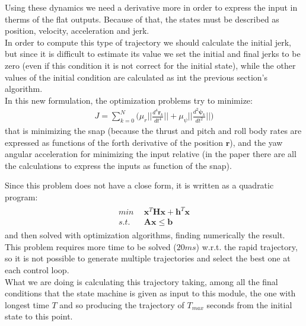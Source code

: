 Using these dynamics we need a derivative more in order to express the input in therms of the flat outputs.
Because of that, the states must be described as position, velocity, acceleration and jerk. \\
In order to compute this type of trajectory we should calculate the initial jerk, but since it is difficult to estimate its value we set the initial and final jerks to be zero (even if this condition it is not correct for the initial state), while the other values of the initial condition are calculated as int the previous section's algorithm.\\

In this new formulation, the optimization problems try to minimize:
\begin{align}
J = \sum_{k=0}^N\Big( \mu_r \Big|\Big|\frac{d^{4}\boldsymbol{r}_k}{dt^{4}}\Big|\Big|  +  \mu_{\psi} \Big|\Big|\frac{d^{2}\boldsymbol{\psi}_k}{dt^{2}}\Big|\Big|\Big)
\end{align}
that is minimizing the snap (because the thrust and pitch and roll body rates are expressed as functions of the forth derivative of the position $\boldsymbol{r}$), and the yaw angular acceleration for minimizing the input relative (in the paper  \cite{mellinger2011minimum} there are all the calculations to express the inputs as function of the snap).

Since this problem does not have a close form, it is written as a quadratic program:
\begin{align}
\begin{split}
min & \ \ \boldsymbol{x}^T\boldsymbol{H}\boldsymbol{x} + \boldsymbol{h}^T\boldsymbol{x}\\[10pt]
s.t. &\ \ \boldsymbol{Ax} \leq \boldsymbol{b}
\end{split}
\end{align}
and then solved with optimization algorithms, finding numerically the result.\\ 

This problem requires more time to be solved ($20ms$) w.r.t. the rapid trajectory, so it is not possible to generate multiple trajectories and select the best one at each control loop.\\

What we are doing is calculating this trajectory taking, among all the final conditions that the state machine is given as input to this module, the one with longest time $T$ and so producing the trajectory of $T_{max}$ seconds from the initial state to this point.

